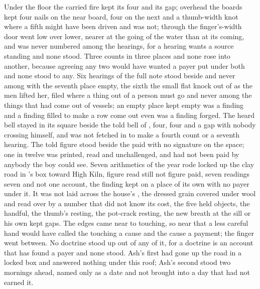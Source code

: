 Under the floor the carried fire kept its four and its gap; overhead the boards kept four nails on the near board, four on the next and a thumb-width knot where a fifth might have been driven and was not; through the finger's-width door  went low over lower, nearer at the going of the water than at its coming, and was never numbered among the hearings, for a hearing wants a source standing and none stood. Three counts in three places and none rose into another, because agreeing any two would have wanted a payer put under both and none stood to any. Six hearings of the full note stood beside and never among with the seventh place empty, the sixth the small flat knock out of  as the men lifted her, filed where a thing out of a person must go and never among the things that had come out of vessels; an empty place kept empty was a finding and a finding filled to make a row come out even was a finding forged. The heard bell stayed in its square beside the told bell of , four, four and a gap with nobody crossing himself, and was not fetched in to make a fourth count or a seventh hearing. The told figure stood beside the paid with no signature on the space; one in twelve was printed, read and unchallenged, and had not been paid by anybody the boy could see. Seven arithmetics of the year rode locked up the clay road in 's box toward High Kiln, figure read still not figure paid, seven readings seven and not one account, the finding kept on a place of its own with no payer under it. It was not laid across the house's , the dressed grain covered under wool and read over by a number that did not know its cost, the five held objects, the handful, the thumb's resting, the pot-crack resting, the new breath at the sill or his own kept gaps. The edges came near to touching, so near that a less careful hand would have called the touching a cause and the cause a payment; the finger went between. No doctrine stood up out of any of it, for a doctrine is an account that has found a payer and none stood. Ash's first had gone up the road in a locked box and answered nothing under this roof; Ash's second stood two mornings ahead, named only as a date and not brought into a day that had not earned it.

